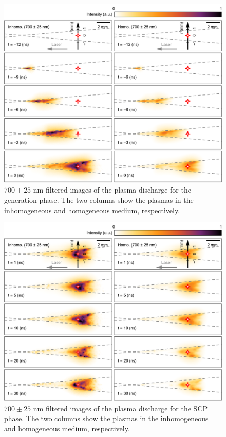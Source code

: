 \begin{figure}[ht!]
\centering
\includegraphics[width=130mm]{figures/ch4/imaging/700gen.pdf}
\caption{$700\pm25 \text{ nm}$ filtered images of the plasma discharge for the generation phase. The two columns show the plasmas in the inhomogeneous and homogeneous medium, respectively.}
\label{fig:700gen}
\end{figure}

\begin{figure}[ht!]
\centering
\includegraphics[width=130mm]{figures/ch4/imaging/700SCP.pdf}
\caption{$700\pm25 \text{ nm}$ filtered images of the plasma discharge for the SCP phase. The two columns show the plasmas in the inhomogeneous and homogeneous medium, respectively.}
\label{fig:700SCP}
\end{figure}

